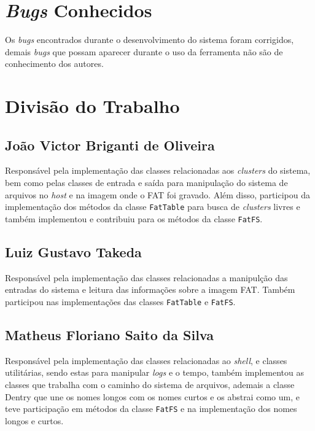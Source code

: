 \documentclass[
    12pt,				%
    oneside,   	        %
    a4paper,			%
    english,			%
    french,				%
    spanish,			%
    brazil,				%
    ]{pacotes/abntex2}
\begin{document}
\section{\textit{Bugs} Conhecidos}
\label{sec:bugs}

Os \textit{bugs} encontrados durante o desenvolvimento do sistema foram corrigidos, demais \textit{bugs} que possam aparecer durante o uso da ferramenta não são de conhecimento dos autores.

\section{Divisão do Trabalho}
\label{sec:trabalhadores_univos}

\subsection{João Victor Briganti de Oliveira}
\label{subsec:joao}

Responsável pela implementação das classes relacionadas aos \textit{clusters} do sistema, bem como pelas classes de entrada e saída para manipulação do sistema de arquivos no \textit{host} e na imagem onde o FAT foi gravado. Além disso, participou da implementação dos métodos da classe \texttt{FatTable} para busca de \textit{clusters} livres e também implementou e contribuiu para os métodos da classe \texttt{FatFS}.

\subsection{Luiz Gustavo Takeda}
\label{subsec:luizinho}

Responsável pela implementação das classes relacionadas a manipulção das entradas do sistema e leitura das informações sobre a imagem FAT. Também participou nas implementações das classes \texttt{FatTable} e \texttt{FatFS}.  

\subsection{Matheus Floriano Saito da Silva}
\label{subsec:peixoto}
Responsável pela implementação das classes relacionadas ao \textit{shell}, e classes utilitárias, sendo estas para manipular \textit{logs} e o tempo, também implementou as classes que trabalha com o caminho do sistema de arquivos, ademais a classe Dentry que une os nomes longos com os nomes curtos e os abstrai como um, e teve participação em métodos da classe \texttt{FatFS} e na implementação dos nomes longos e curtos.
\end{document}
